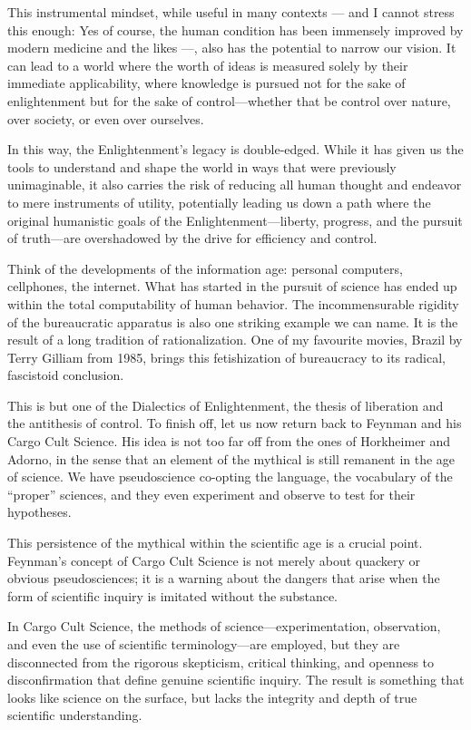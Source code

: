 This instrumental mindset, while useful in many contexts --- and I cannot
stress this enough: Yes of course, the human condition has been immensely
improved by modern medicine and the likes ---, also has the
potential to narrow our vision. It can lead to a world where the worth of ideas
is measured solely by their immediate applicability, where knowledge is pursued
not for the sake of enlightenment but for the sake of control—whether that be
control over nature, over society, or even over ourselves.

In this way, the Enlightenment's legacy is double-edged. While it has given us
the tools to understand and shape the world in ways that were previously
unimaginable, it also carries the risk of reducing all human thought and
endeavor to mere instruments of utility, potentially leading us down a path
where the original humanistic goals of the Enlightenment—liberty, progress, and
the pursuit of truth—are overshadowed by the drive for efficiency and control.

Think of the developments of the information age: personal computers,
cellphones, the internet. What has started in the pursuit of science has ended
up within the total computability of human behavior. The incommensurable
rigidity of the bureaucratic apparatus is also one striking example we can
name. It is the result of a long tradition of rationalization. One of my
favourite movies, Brazil by Terry Gilliam from 1985, brings this fetishization
of bureaucracy to its radical, fascistoid conclusion.

This is but one of the Dialectics of Enlightenment, the thesis of liberation
and the antithesis of control. To finish off, let us now return back to Feynman
and his Cargo Cult Science. His idea is not too far off from the ones of
Horkheimer and Adorno, in the sense that an element of the mythical is still
remanent in the age of science. We have pseudoscience co-opting the language,
the vocabulary of the \enquote{proper} sciences, and they even experiment and
observe to test for their hypotheses. 

This persistence of the mythical within the scientific age is a crucial point.
Feynman’s concept of Cargo Cult Science is not merely about quackery or obvious
pseudosciences; it is a warning about the dangers that arise when the form of
scientific inquiry is imitated without the substance.

In Cargo Cult Science, the methods of science—experimentation, observation, and
even the use of scientific terminology—are employed, but they are disconnected
from the rigorous skepticism, critical thinking, and openness to
disconfirmation that define genuine scientific inquiry. The result is something
that looks like science on the surface, but lacks the integrity and depth of
true scientific understanding.

